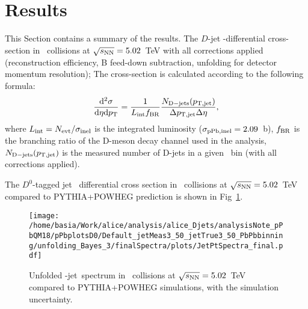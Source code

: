 
\section{Results}


This Section contains a summary of the results.
The  $D$-jet \pt-differential cross-section in \pPb\ collisions at $\sqrt{s_{\rm NN}}=5.02$~TeV  with all corrections applied (reconstruction efficiency, B feed-down subtraction, unfolding for detector momentum resolution);
The cross-section is calculated according to the following formula:
\begin{equation}
\frac{{\rm d}^2\sigma}{{\rm d}\eta {\rm d}p_{\rm T}}=\frac{1}{L_{\rm int}f_{\rm BR}} \frac{N_{\rm D-jets}(p_{\mathrm{T,jet}})}{\Delta p_{\mathrm{T,jet}}\Delta\eta},
\end{equation}
where $L_{\rm int}=N_{\rm evt}/\sigma_{\rm inel}$ is the integrated luminosity ($\sigma_{\rm pPb, inel} = 2.09$~b), $f_{\rm BR}$ is the branching
ratio of the D-meson decay channel used in the analysis, $N_{\rm D-jets}(p_{\mathrm{T,jet}})$ is the measured number of D-jets in a given \ptjet\ bin (with all corrections applied).


The $D^{0}$-tagged jet \pt\ differential cross section in \pPb\ collisions at $\sqrt{s_{\rm NN}}=5.02$~TeV compared to PYTHIA+POWHEG prediction is shown in Fig~\ref{fig:PbPb_pPbJetPt_final_D0}.
\begin{figure}[bth]
\centering
\texttt{[image: /home/basia/Work/alice/analysis/alice\_Djets/analysisNote\_pPbQM18/pPbplotsD0/Default\_jetMeas3\_50\_jetTrue3\_50\_PbPbbinning/unfolding\_Bayes\_3/finalSpectra/plots/JetPtSpectra\_final.pdf]}
\caption{Unfolded \Dzero-jet\ spectrum in \pPb\ collisions at $\sqrt{s_{\rm NN}}=5.02$~TeV compared to PYTHIA+POWHEG simulations, with the simulation uncertainty.}
\label{fig:PbPb_pPbJetPt_final_D0}
\end{figure}


